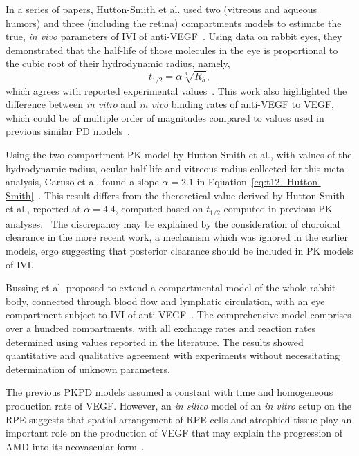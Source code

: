 \documentclass{article}
\begin{document}
In a series of papers, Hutton-Smith et al. used two (vitreous and aqueous humors) and three (including the retina) compartments models to estimate the true, \textit{in vivo} parameters of IVI of anti-VEGF~\cite{HuttonSmith_2016,HuttonSmith_2017,HuttonSmith_2018}.
Using data on rabbit eyes, they demonstrated that the half-life of those molecules in the eye is proportional to the cubic root of their hydrodynamic radius, namely,
\begin{equation}
  \label{eq:t12_Hutton-Smith}
  t_{1/2} = \alpha\sqrt[3]{R_h},
\end{equation}
which agrees with reported experimental values~\cite{HuttonSmith_2016}.
This work also highlighted the difference between \textit{in vitro} and \textit{in vivo} binding rates of anti-VEGF to VEGF, which could be of multiple order of magnitudes compared to values used in previous similar PD models~\cite{Saunders_2015}.

Using the two-compartment PK model by Hutton-Smith et al., with values of the hydrodynamic radius, ocular half-life and vitreous radius collected for this meta-analysis, Caruso et al. found a slope $\alpha=2.1$ in Equation~\ref{eq:t12_Hutton-Smith}~\cite{Caruso_2020}.
This result differs from the theroretical value derived by Hutton-Smith et al., reported at $\alpha=4.4$, computed based on $t_{1/2}$ computed in previous PK analyses.~\cite{HuttonSmith_2016}
The discrepancy may be explained by the consideration of choroidal clearance in the more recent work, a mechanism which was ignored in the earlier models, ergo suggesting that posterior clearance should be included in PK models of IVI.


Bussing et al. proposed to extend a compartmental model of the whole rabbit body, connected through blood flow and lymphatic circulation, with an eye compartment subject to IVI of anti-VEGF~\cite{Bussing_2020}.
The comprehensive model comprises over a hundred compartments, with all exchange rates and reaction rates determined using values reported in the literature.
The results showed quantitative and qualitative agreement with experiments without necessitating determination of unknown parameters. 

The previous PKPD models assumed a constant with time and homogeneous production rate of VEGF.
However, an \textit{in silico} model of an \textit{in vitro} setup on the RPE suggests that spatial arrangement of RPE cells and atrophied tissue play an important role on the production of VEGF that may explain the progression of AMD into its neovascular form~\cite{Baker_2017}.  
\end{document}
